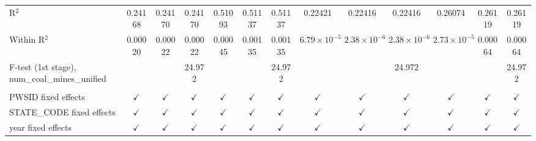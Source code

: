 \begin{table}[htbp]
\begin{adjustbox}{width = \textwidth, center}
\begin{tabular}{lcccccccccccc}
         R$^2$                                            & 0.24168       & 0.24170       & 0.24170       & 0.51093       & 0.51137         & 0.51137        & 0.22421               & 0.22416               & 0.22416               & 0.26074               & 0.26119        & 0.26119\\  
         Within R$^2$                                     & 0.00020       & 0.00022       & 0.00022       & 0.00045       & 0.00135         & 0.00135        & $6.79\times 10^{-5}$  & $2.38\times 10^{-6}$  & $2.38\times 10^{-6}$  & $2.73\times 10^{-5}$  & 0.00064        & 0.00064\\  
         F-test (1st stage), num\_coal\_mines\_unified    &               &               & 24.972        &               &                 & 24.972         &                       &                       & 24.972                &                       &                & 24.972\\  
          \\
         PWSID fixed effects                              & $\checkmark$  & $\checkmark$  & $\checkmark$  & $\checkmark$  & $\checkmark$    & $\checkmark$   & $\checkmark$          & $\checkmark$          & $\checkmark$          & $\checkmark$          & $\checkmark$   & $\checkmark$\\   
         STATE\_CODE fixed effects                        & $\checkmark$  & $\checkmark$  & $\checkmark$  & $\checkmark$  & $\checkmark$    & $\checkmark$   & $\checkmark$          & $\checkmark$          & $\checkmark$          & $\checkmark$          & $\checkmark$   & $\checkmark$\\   
         year fixed effects                               & $\checkmark$  & $\checkmark$  & $\checkmark$  & $\checkmark$  & $\checkmark$    & $\checkmark$   & $\checkmark$          & $\checkmark$          & $\checkmark$          & $\checkmark$          & $\checkmark$   & $\checkmark$\\   
         \bottomrule
      \end{tabular}
   \end{adjustbox}
\end{table}


